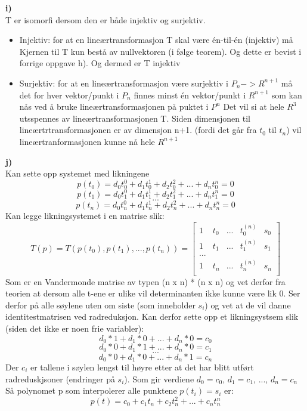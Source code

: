 \documentclass[12pt,norsk,a4paper]{article}
\begin{document}
        \textbf{i)}\\
        T er isomorfi dersom den er både injektiv og surjektiv.\\
        \begin{itemize}
            \item Injektiv: for at en lineærtransformasjon T skal være én-til-én (injektiv) må Kjernen til T kun bestå av nullvektoren (i følge teorem). Og dette er bevist i forrige oppgave h). Og dermed er T injektiv
            \item Surjektiv: for at en lineærtransformasjon være surjektiv i $P_n -> R^{n+1}$ må det for hver vektor/punkt i $P_n$ finnes minst én vektor/punkt i $R^{n+1}$ som kan nås ved å bruke lineærtransformasjonen på puktet i $P^n$
            Det vil si at hele $R^3$ utsspennes av lineærtransformasjonen T. Siden dimensjonen til lineærtrtransformasjonen er av dimensjon n+1. (fordi det går fra $t_0$ til $t_n$) vil lineærtranformasjonen kunne nå hele $R^{n+1}$
        \end{itemize}


        \textbf{j)}\\
            Kan sette opp systemet med likningene
            \[p(t_0) = d_0t_0^0 + d_1t_0^1 + d_2t_0^2 + ... + d_nt_0^n = 0\]
            \[p(t_1) = d_0t_1^0 + d_1t_1^1 + d_2t_1^2 + ... + d_nt_1^n = 0\]
            \[...\]
            \[p(t_n) = d_0t_n^0 + d_1t_n^1 + d_2t_n^2 + ... + d_nt_n^n = 0\]
            Kan legge likningsystemet i en matrise slik:\\
            \[ T(p) = T(p(t_0), p(t_1), ..., p(t_n)) = \left[ \begin{array}{ccccc}
                1 & t_0 & ... & t_0^{(n)} & s_0\\
                1 & t_1 & ... & t_1^{(n)} & s_1\\
                ... &  &  &  & \\
                1 & t_n & ... & t_n^{(n)} & s_n\\
            \end{array} \right] \]
            Som er en Vandermonde matrise av typen (n x n) * (n x n) og vet derfor fra teorien at dersom alle t-ene er ulike
            vil determinanten ikke kunne være lik 0. Ser derfor på alle søylene uten om siste (som inneholder $s_i$) og vet at
            de vil danne identitestmatrisen ved radreduksjon. Kan derfor sette opp et likningsystsem slik (siden det ikke er noen frie variabler):
            \[d_0*1 + d_1*0 + ... + d_n*0 = c_0\]
            \[d_0*0 + d_1*1 + ... + d_n*0 = c_1\]
            \[...\]
            \[d_0*0 + d_1*0 + ... + d_n*1 = c_n\]
            Der $c_i$ er tallene i søylen lengst til høyre etter at det har blitt utført radreduskjsoner (endringer på $s_i$).
            Som gir verdiene $d_0 = c_0$, $d_1 = c_1$, ..., $d_n = c_n$\\
            Så polynomet p som interpolerer alle punktene $p(t_i)=s_i$ er:\\
            \[p(t) = c_0 + c_1t_n + c_2t_n^2 + ... + c_nt_n^n\]
            
\end{document}
